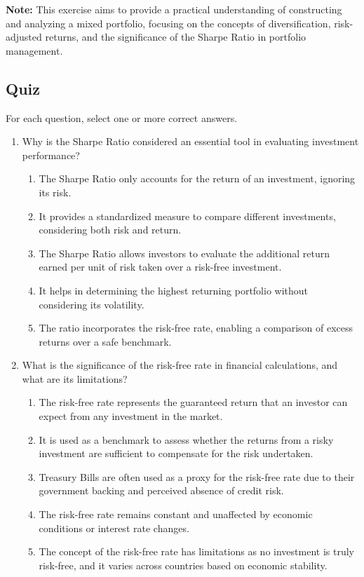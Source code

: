 \documentclass{article}
\begin{document}
\textbf{Note:} This exercise aims to provide a practical understanding of constructing and analyzing a mixed portfolio, focusing on the concepts of diversification, risk-adjusted returns, and the significance of the Sharpe Ratio in portfolio management.

\subsection{Quiz}
For each question, select one or more correct answers.

\begin{enumerate}
    \item Why is the Sharpe Ratio considered an essential tool in evaluating investment performance?
    \begin{enumerate}
        \item The Sharpe Ratio only accounts for the return of an investment, ignoring its risk.
        \item It provides a standardized measure to compare different investments, considering both risk and return.
        \item The Sharpe Ratio allows investors to evaluate the additional return earned per unit of risk taken over a risk-free investment.
        \item It helps in determining the highest returning portfolio without considering its volatility.
        \item The ratio incorporates the risk-free rate, enabling a comparison of excess returns over a safe benchmark.
    \end{enumerate}
    
    \item What is the significance of the risk-free rate in financial calculations, and what are its limitations?
    \begin{enumerate}
        \item The risk-free rate represents the guaranteed return that an investor can expect from any investment in the market.
        \item It is used as a benchmark to assess whether the returns from a risky investment are sufficient to compensate for the risk undertaken.
        \item Treasury Bills are often used as a proxy for the risk-free rate due to their government backing and perceived absence of credit risk.
        \item The risk-free rate remains constant and unaffected by economic conditions or interest rate changes.
        \item The concept of the risk-free rate has limitations as no investment is truly risk-free, and it varies across countries based on economic stability.
    \end{enumerate}


\end{enumerate}
\end{document}
